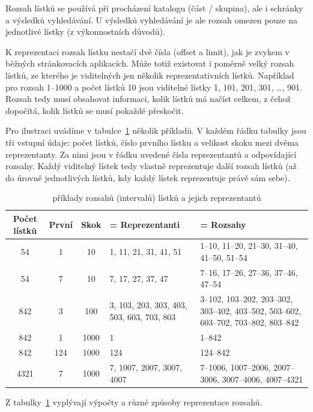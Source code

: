 Rozsah lístků se používá při procházení katalogu (část / skupina), ale i schránky a výsledků vyhledávání. U výsledků vyhledávání je ale rozsah omezen pouze na jednotlivé lístky (z výkonnostních důvodů).

K reprezentaci rozsah lístku nestačí dvě čísla (offset a limit), jak je zvykem v běžných stránkovacích aplikacích. Může totiž existovat i poměrně velký rozsah lístků, ze kterého je viditelných jen několik reprezentativních lístků. Například pro rozsah 1--1000 a počet lístků 10 jsou viditelné lístky 1, 101, 201, 301, \ldots, 901. Rozsah tedy musí obsahovat informaci, kolik lístků má načíst celkem, z čehož dopočítá, kolik lístků se musí pokaždé přeskočit.

Pro ilustraci uvádíme v tabulce~\ref{tab:range} několik příkladů. V každém řádku tabulky jsou tři vstupní údaje: počet lístků, číslo prvního lístku a velikost skoku mezi dvěma reprezentanty. Za nimi jsou v řádku uvedené čísla reprezentantů a odpovídající rozsahy. Každý viditelný lístek tedy vlastně reprezentuje další rozsah lístků (až do úrovně jednotlivých lístků, kdy každý lístek reprezentuje právě sám sebe).

\begin{table}
\begin{center}
\begin{tabular}{|c|c|c|p{5cm}|p{5cm}|}
\hline
Počet lístků & První & Skok & = Reprezentanti & = Rozsahy \\
\hline
\hline
54 & 1 & 10 & 1, 11, 21, 31, 41, 51 & 1--10, 11--20, 21--30, 31--40, 41--50, 51--54 \\
\hline
54 & 7 & 10 & 7, 17, 27, 37, 47 & 7--16, 17--26, 27--36, 37--46, 47--54 \\
\hline
842 & 3 & 100 & 3, 103, 203, 303, 403, 503, 603, 703, 803 & 3--102, 103--202, 203--302, 303--402, 403--502, 503--602, 603--702, 703--802, 803--842 \\
\hline
842 & 1 & 1000 & 1 & 1--842 \\
\hline
842 & 124 & 1000 & 124 & 124--842 \\
\hline
4321 & 7 & 1000 & 7, 1007, 2007, 3007, 4007 & 7--1006, 1007--2006, 2007--3006, 3007--4006, 4007--4321 \\
\hline
\end{tabular}
\end{center}
\caption{příklady rozsahů (intervalů) lístků a jejich reprezentantů}
\label{tab:range}
\end{table}

Z tabulky~\ref{tab:range} vyplývají výpočty a různé způsoby reprezentace rozsahů.

